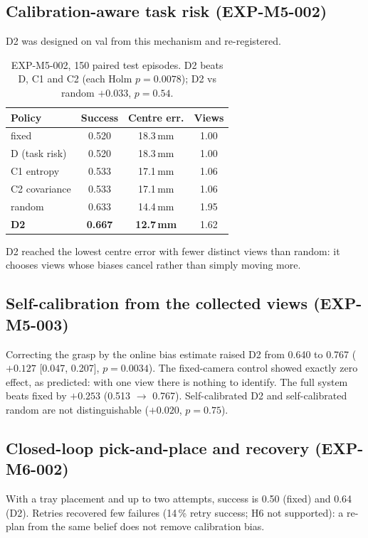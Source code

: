 \documentclass[10pt,twocolumn]{article}
\begin{document}
\subsection{Calibration-aware task risk (EXP-M5-002)}
D2 was designed on val from this mechanism and re-registered.
\begin{table}[h]\centering\small
\begin{tabular}{lccc}\toprule
Policy & Success & Centre err. & Views\\\midrule
fixed & 0.520 & 18.3\,mm & 1.00\\
D (task risk) & 0.520 & 18.3\,mm & 1.00\\
C1 entropy & 0.533 & 17.1\,mm & 1.06\\
C2 covariance & 0.533 & 17.1\,mm & 1.06\\
random & 0.633 & 14.4\,mm & 1.95\\
\textbf{D2} & \textbf{0.667} & \textbf{12.7\,mm} & 1.62\\\bottomrule
\end{tabular}
\caption{EXP-M5-002, 150 paired test episodes. D2 beats D, C1 and C2 (each Holm $p=0.0078$);
D2 vs random $+0.033$, $p=0.54$.}
\end{table}
D2 reached the lowest centre error with fewer distinct views than random: it chooses views whose
biases cancel rather than simply moving more.

\subsection{Self-calibration from the collected views (EXP-M5-003)}
Correcting the grasp by the online bias estimate raised D2 from 0.640 to 0.767 ($+0.127$
[0.047, 0.207], $p=0.0034$). The fixed-camera control showed exactly zero effect, as predicted:
with one view there is nothing to identify. The full system beats fixed by $+0.253$ (0.513
$\rightarrow$ 0.767). Self-calibrated D2 and self-calibrated random are not distinguishable
($+0.020$, $p=0.75$).

\subsection{Closed-loop pick-and-place and recovery (EXP-M6-002)}
With a tray placement and up to two attempts, success is 0.50 (fixed) and 0.64 (D2). Retries
recovered few failures (14\,\% retry success; H6 not supported): a re-plan from the same belief
does not remove calibration bias.
\end{document}
